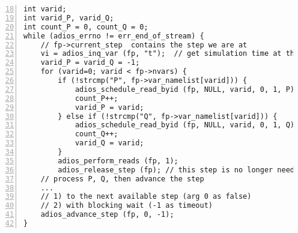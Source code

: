\begin{lstlisting}[numbers=left, numberstyle=\color{gray}, stepnumber=2,firstnumber=18,
                             caption={Processing varying set of variables in a stream},  label=code:stream_variable_stepping]
int varid;
int varid_P, varid_Q;
int count_P = 0, count_Q = 0;
while (adios_errno != err_end_of_stream) {
    // fp->current_step  contains the step we are at
    vi = adios_inq_var (fp, "t");  // get simulation time at this step
    varid_P = varid_Q = -1; 
    for (varid=0; varid < fp->nvars) {
        if (!strcmp("P", fp->var_namelist[varid])) {
            adios_schedule_read_byid (fp, NULL, varid, 0, 1, P);
            count_P++;
            varid_P = varid;
        } else if (!strcmp("Q", fp->var_namelist[varid])) {
            adios_schedule_read_byid (fp, NULL, varid, 0, 1, Q);
            count_Q++;
            varid_Q = varid;
        }
        adios_perform_reads (fp, 1);   
        adios_release_step (fp); // this step is no longer needed
    // process P, Q, then advance the step
    ...
    // 1) to the next available step (arg 0 as false) 
    // 2) with blocking wait (-1 as timeout)
    adios_advance_step (fp, 0, -1);
}
\end{lstlisting}


